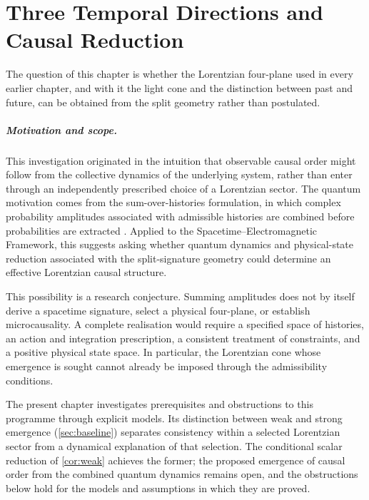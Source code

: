 \chapter{Three Temporal Directions and Causal Reduction}
\label{ch:ch12_causal}

The question of this chapter is whether the Lorentzian four-plane used in every earlier chapter, and with it the light cone and the
distinction between past and future, can be obtained from the split geometry rather than postulated.

\paragraph{Motivation and scope.} This investigation originated in the intuition that observable causal order might follow from the
collective dynamics of the underlying system, rather than enter through an independently prescribed choice of a Lorentzian sector. The
quantum motivation comes from the sum-over-histories formulation, in which complex probability amplitudes associated with admissible
histories are combined before probabilities are extracted \cite{Feynman48}. Applied to the Spacetime--Electromagnetic Framework, this
suggests asking whether quantum dynamics and physical-state reduction associated with the split-signature geometry could determine an
effective Lorentzian causal structure.

This possibility is a research conjecture. Summing amplitudes does not by itself derive a spacetime signature, select a physical four-plane,
or establish microcausality. A complete realisation would require a specified space of histories, an action and integration prescription,
a consistent treatment of constraints, and a positive physical state space. In particular, the Lorentzian cone whose emergence is sought
cannot already be imposed through the admissibility conditions.

The present chapter investigates prerequisites and obstructions to this programme through explicit models. Its distinction between weak
and strong emergence (\cref{sec:baseline}) separates consistency within a selected Lorentzian sector from a dynamical explanation of that
selection. The conditional scalar reduction of \cref{cor:weak} achieves the former; the proposed emergence of causal order from the combined
quantum dynamics remains open, and the obstructions below hold for the models and assumptions in which they are proved.

